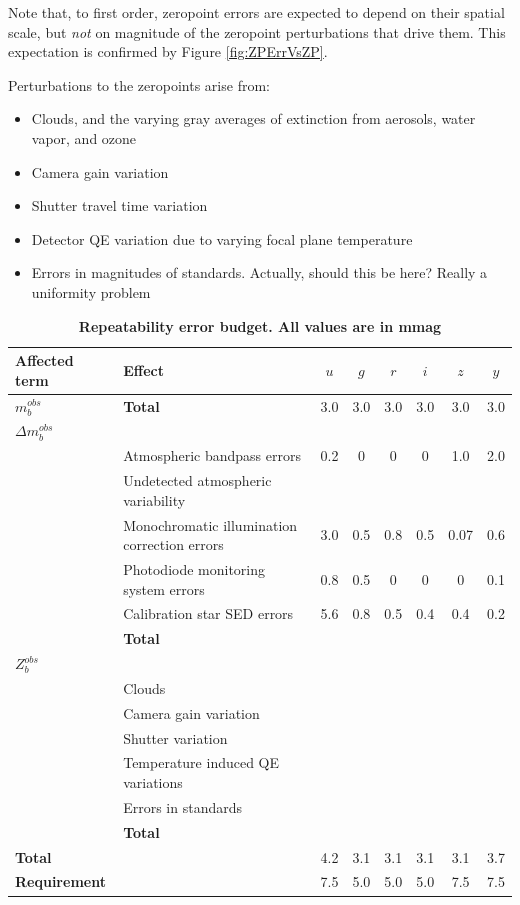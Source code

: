 \documentclass[12pt,preprint]{aastex}
\begin{document}
Note that, to first order, zeropoint errors are expected to depend on their spatial scale, but {\it not} on magnitude of the zeropoint
perturbations that drive them.  This expectation is confirmed by Figure \ref{fig:ZPErrVsZP}.

Perturbations to the zeropoints arise from:
\begin{itemize}
\item{Clouds, and the varying gray averages of extinction from aerosols, water vapor, and ozone}
\item{Camera gain variation}
\item{Shutter travel time variation}
\item{Detector QE variation due to varying focal plane temperature}
\item{Errors in magnitudes of standards.  Actually, should this be here?  Really a uniformity problem}
\end{itemize}

\begin{center}
\begin{table}[htb]
\caption{{\bf Repeatability error budget.  All values are in mmag} }
\begin{tabular}{l | l | c c c c c c }
Affected term & Effect &  $u$  & $g$ & $r$ & $i$ & $z$ & $y$ \\ \hline
{\bf $m_b^{obs}$} & {\bf Total} & 3.0 & 3.0 & 3.0 & 3.0 & 3.0 & 3.0 \\ \hline
{\bf $\Delta m_b^{obs}$} & & & & \\
& Atmospheric bandpass errors & 0.2 & 0 & 0 & 0 & 1.0 & 2.0  \\
& Undetected atmospheric variability & & & \\
& Monochromatic illumination correction errors & 3.0 & 0.5 & 0.8 & 0.5 & 0.07 & 0.6\\
& Photodiode monitoring system errors & 0.8 & 0.5 & 0 & 0 & 0 & 0.1 \\
& Calibration star SED errors & 5.6 & 0.8 & 0.5 & 0.4 & 0.4 & 0.2 \\ 
& {\bf Total} & & & \\ \hline
$Z_b^{obs}$ & & & & \\
& Clouds & & &  \\
& Camera gain variation & & & \\
& Shutter variation & & & \\
& Temperature induced QE variations & & & \\
& Errors in standards & & & \\
& {\bf Total} & & & \\ \hline
{\bf Total} & & 4.2 & 3.1 & 3.1 & 3.1 & 3.1 & 3.7 \\ \hline
{\bf Requirement} & & 7.5 & 5.0 & 5.0 & 5.0 & 7.5 & 7.5 \\ 
\end{tabular}
\label{tab:rpt_error_budget}
\end{table}
\end{center}
\end{document}
